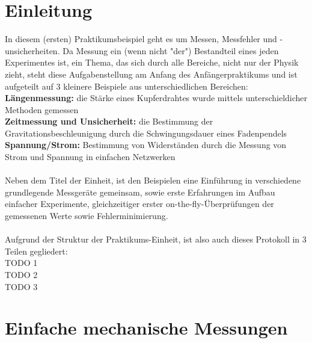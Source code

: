 \documentclass[12pt,a4paper]{article}
\begin{document}
\pagebreak
\setlength{\columnsep}{20pt}
\begin{multicols}{2}
\section{Einleitung}
In diesem (ersten) Praktikumsbeispiel geht es um Messen, Messfehler und -unsicherheiten.
Da Messung ein (wenn nicht "der") Bestandteil eines jeden Experimentes ist, ein Thema, das sich durch alle Bereiche, nicht nur der Physik zieht, steht diese Aufgabenstellung am Anfang des Anfängerpraktikums und ist aufgeteilt auf 3 kleinere Beispiele aus unterschiedlichen Bereichen:\\
\textbf{Längenmessung:} die Stärke eines Kupferdrahtes wurde mittels unterschieldicher Methoden gemessen\\
\textbf{Zeitmessung und Unsicherheit:} die Bestimmung der Gravitationsbeschleunigung durch die Schwingungsdauer eines Fadenpendels\\
\textbf{Spannung/Strom:} Bestimmung von Widerständen durch die Messung von Strom und Spannung in einfachen Netzwerken\\
\\
Neben dem Titel der Einheit, ist den Beispielen eine Einführung in verschiedene grundlegende Messgeräte gemeinsam, sowie erste Erfahrungen im Aufbau einfacher Experimente, gleichzeitiger erster on-the-fly-Überprüfungen der gemessenen Werte sowie Fehlerminimierung.\\
\\
Aufgrund der Struktur der Praktikums-Einheit, ist also auch dieses Protokoll in 3 Teilen gegliedert:\\
TODO 1\\
TODO 2\\
TODO 3\\

\section{Einfache mechanische Messungen}

\end{multicols}
\end{document}
